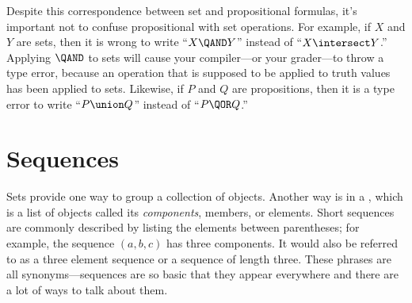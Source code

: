 Despite this correspondence between set and propositional formulas,
it's important not to confuse propositional with set operations.  For
example, if $X$ and $Y$ are sets, then it is wrong to write ``$X \QAND
Y$'' instead of ``$X \intersect Y$.''  Applying $\QAND$ to sets will
cause your compiler---or your grader---to throw a type error, because
an operation that is supposed to be applied to truth values has been
applied to sets.  Likewise, if $P$ and $Q$ are propositions, then it
is a type error to write ``$P \union Q$'' instead of ``$P \QOR Q$.''

\iffalse
Although the basic set operations and propositional connectives are
similar, it's important not to confuse one with the other.  For
example, $\union$ resembles $\QOR$, and in fact was defined directly
in terms of $\QOR$:
\[
x \in A \union B  \text{  is equivalent to  } (x \in A\ \QOR\ x \in B).
\]
Similarly, $\intersect$ resembles $\QAND$, and complement resembles $\QNOT$.

\[
x \in A \intersect B  \text{  is equivalent to  } x \in A\ \QAND\ x \in B,
\]
and
\[
x \in \bar{A}  \text{  is equivalent to  } \QNOT(x \in A).
\]

But if $A$ and $B$ are sets, writing $A\ \QAND\ B$ is a type-error,
since $\QAND$ is an operation on truth-values, not sets.  Similarly,
if $P$ and $Q$ are propositional variables, writing $P \union Q$ is
another type-error.
\fi


\begin{problems}

\practiceproblems
{}

\classproblems
{}

\homeworkproblems
{}

\examproblems
{}

\end{problems}

\section{Sequences}\label{seq_sec}

Sets provide one way to group a collection of objects.  Another way is
in a , which is a list of objects called its
\emph{components}, members, or elements.  Short sequences are commonly
described by listing the elements between parentheses; for example,
the sequence $(a, b, c)$ has three components.  It would also be
referred to as a three element sequence or a sequence of length three.
These phrases are all synonyms---sequences are so basic that they
appear everywhere and there are a lot of ways to talk about them.

